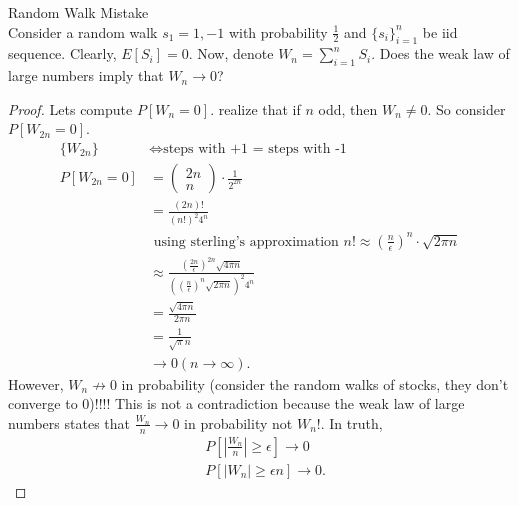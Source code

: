 \documentclass[a4paper]{article}
\begin{document}
  \begin{note}{Random Walk Mistake}\\
    Consider a random walk $s_1 = 1, -1$ with probability  $\frac{1}{2}$ and $\{s_i\}_{i=1}^{n} $ be iid sequence. Clearly, $E[S_i] = 0$. Now, denote  $W_n = \sum_{i=1}^{n} S_i$. Does the weak law of large numbers imply that $W_n \to 0$?

    \begin{proof}
      Lets compute $P[W_n = 0]$. realize that if $n$ odd, then  $W_n \neq 0$. So consider  $P[W_{2n} = 0]$.
       \begin{align*}
         \{W_{2n}\} &\iff \text{steps with +1 = steps with -1} \\
          P[W_{2n} = 0] &= \begin{pmatrix} 2n \\ n \end{pmatrix} \cdot \frac{1}{2^{2n}} \\
                        &= \frac{(2n)!}{(n!)^{2} 4^{n}} \\
                        &\text{ using sterling's approximation $n! \approx \left( \frac{n}{\epsilon} \right)^{n} \cdot \sqrt{2\pi n}  $} \\
                        &\approx \frac{\left( \frac{2n}{\epsilon} \right)^{2n} \sqrt{4 \pi n}  }{\left( (\frac{n}{\epsilon})^{n} \sqrt{2 \pi n}  \right)^{2} 4^{n} } \\
                        &= \frac{\sqrt{4 \pi n} }{2 \pi n} \\
                        &= \frac{1}{\sqrt{\pi} n  } \\
                        &\to 0 (n \to \infty)
       .\end{align*}
       However, $W_n \not\to 0$ in probability (consider the random walks of stocks, they don't converge to 0)!!!! This is not a contradiction because the weak law of large numbers states that $\frac{W_n}{n} \to 0$ in probability not $W_n$!. In truth,
       \begin{align*}
         & P[|\frac{W_n}{n}| \geq \epsilon] \to 0 \\
         & P[|W_n| \geq \epsilon n] \to 0  
       .\end{align*}
    \end{proof}
\end{note}
\end{document}
